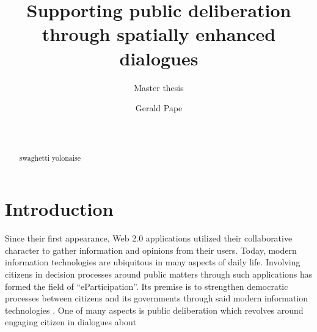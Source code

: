 \documentclass{sigchi}
\begin{document}
\title{Supporting public deliberation\\through spatially enhanced dialogues}
\subtitle{Master thesis}

\author{
  \alignauthor Gerald Pape\\
    \\
    \\
}

\maketitle

\begin{abstract}
swaghetti yolonaise
\end{abstract}




\section{Introduction}
Since their first appearance, Web 2.0 applications utilized their collaborative character to gather information and opinions from their users. Today, modern information technologies are ubiquitous in many aspects of daily life. Involving citizens in decision processes around public matters through such applications has formed the field of ``eParticipation''. Its premise is to strengthen democratic processes between citizens and its governments through said modern information technologies \cite{Saebo_eParticipation, Medaglia2012_eParticipation}. One of many aspects is public deliberation which revolves around engaging citizen in dialogues about 
\end{document}
